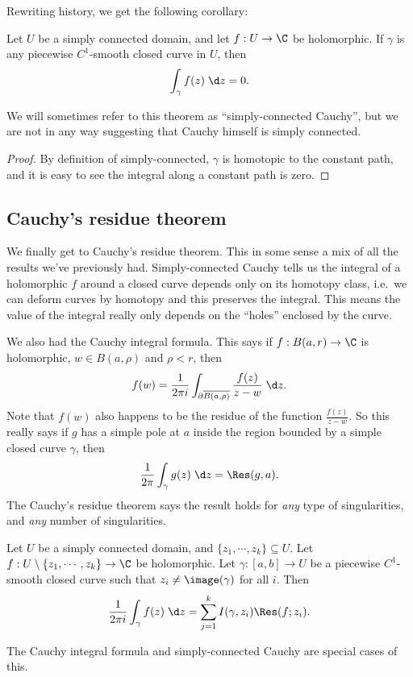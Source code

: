 \documentclass[a4paper]{article}
\begin{document}
Rewriting history, we get the following corollary:
\begin{cor}
  Let $U$ be a simply connected domain, and let $f: U \to \C$ be holomorphic. If $\gamma$ is any piecewise $C^1$-smooth closed curve in $U$, then
  \[
    \int_\gamma f(z)\;\d z = 0.
  \]
\end{cor}
We will sometimes refer to this theorem as ``simply-connected Cauchy'', but we are not in any way suggesting that Cauchy himself is simply connected.

\begin{proof}
  By definition of simply-connected, $\gamma$ is homotopic to the constant path, and it is easy to see the integral along a constant path is zero.
\end{proof}

\subsection{Cauchy's residue theorem}
We finally get to Cauchy's residue theorem. This in some sense a mix of all the results we've previously had. Simply-connected Cauchy tells us the integral of a holomorphic $f$ around a closed curve depends only on its homotopy class, i.e.\ we can deform curves by homotopy and this preserves the integral. This means the value of the integral really only depends on the ``holes'' enclosed by the curve.

We also had the Cauchy integral formula. This says if $f: B(a, r) \to \C$ is holomorphic, $w \in B(a, \rho)$ and $\rho < r$, then
\[
  f(w) = \frac{1}{2\pi i} \int_{\partial \overline{B(a, \rho)}} \frac{f(z)}{z - w}\;\d z.
\]
Note that $f(w)$ also happens to be the residue of the function $\frac{f(z)}{z - w}$. So this really says if $g$ has a simple pole at $a$ inside the region bounded by a simple closed curve $\gamma$, then
\[
  \frac{1}{2\pi} \int_\gamma g(z)\;\d z = \Res (g, a).
\]
The Cauchy's residue theorem says the result holds for \emph{any} type of singularities, and \emph{any} number of singularities.

\begin{thm}
  Let $U$ be a simply connected domain, and $\{z_1, \cdots, z_k\} \subseteq U$. Let $f: U \setminus \{z_1, \cdots, z_k\} \to \C$ be holomorphic. Let $\gamma: [a, b] \to U$ be a piecewise $C^1$-smooth closed curve such that $z_i \not= \image(\gamma)$ for all $i$. Then
  \[
    \frac{1}{2\pi i} \int_{\gamma}f(z)\;\d z = \sum_{j = 1}^k I(\gamma, z_i) \Res(f; z_i).
  \]
\end{thm}
The Cauchy integral formula and simply-connected Cauchy are special cases of this.
\end{document}
